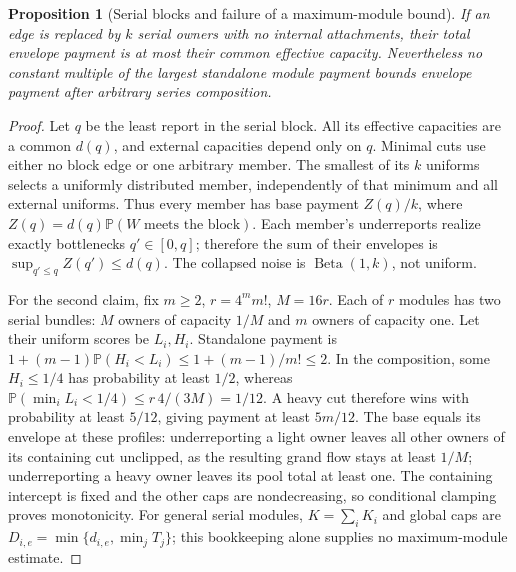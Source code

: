 \documentclass[11pt]{article}
\newtheorem{proposition}[theorem]{Proposition}
\theoremstyle{definition}\newtheorem{definition}[theorem]{Definition}
\theoremstyle{remark}\newtheorem{remark}[theorem]{Remark}
\newcommand{\Prob}{\mathbb P}
\begin{document}
\begin{proposition}[Serial blocks and failure of a maximum-module bound]
\label{noise:series}
If an edge is replaced by $k$ serial owners with no internal attachments,
their total envelope payment is at most their common effective capacity.
Nevertheless no constant multiple of the largest standalone module payment
bounds envelope payment after arbitrary series composition.
\end{proposition}
\begin{proof}
Let $q$ be the least report in the serial block. All its effective capacities
are a common $d(q)$, and external capacities depend only on $q$. Minimal cuts
use either no block edge or one arbitrary member. The smallest of its $k$
uniforms selects a uniformly distributed member, independently of that
minimum and all external uniforms. Thus every member has base payment
$Z(q)/k$, where $Z(q)=d(q)\Prob(W\text{ meets the block})$.
Each member's underreports realize exactly bottlenecks $q'\in[0,q]$;
therefore the sum of their envelopes is $\sup_{q'\le q}Z(q')\le d(q)$.
The collapsed noise is $\operatorname{Beta}(1,k)$, not uniform.

For the second claim, fix $m\ge2$, $r=4^m m!$, $M=16r$. Each of $r$
modules has two serial bundles: $M$ owners of capacity $1/M$ and $m$
owners of capacity one. Let their uniform scores be $L_i,H_i$.
Standalone payment is $1+(m-1)\Prob(H_i<L_i)\le1+(m-1)/m!\le2$.
In the composition, some $H_i\le1/4$ has probability at least $1/2$,
whereas $\Prob(\min_iL_i<1/4)\le r\,4/(3M)=1/12$.
A heavy cut therefore wins with probability at least $5/12$, giving payment
at least $5m/12$. The base equals its envelope at these profiles: underreporting
a light owner leaves all other owners of its containing cut unclipped, as
the resulting grand flow stays at least $1/M$; underreporting a heavy owner
leaves its pool total at least one. The containing intercept is fixed and
the other caps are nondecreasing, so conditional clamping proves monotonicity.
For general serial modules, $K=\sum_iK_i$ and global caps are
$D_{i,e}=\min\{d_{i,e},\min_jT_j\}$; this bookkeeping alone supplies no
maximum-module estimate.
\end{proof}
\end{document}
